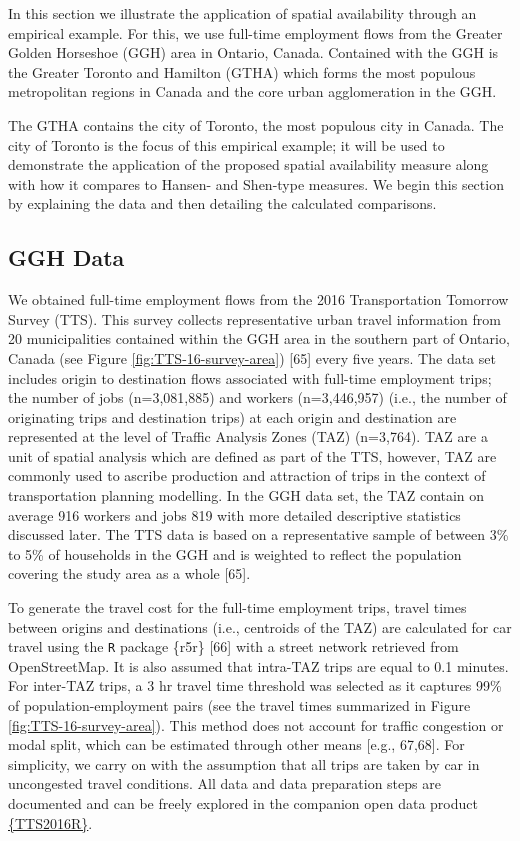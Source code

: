 \documentclass[10pt,letterpaper]{article}
\begin{document}
In this section we illustrate the application of spatial availability
through an empirical example. For this, we use full-time employment
flows from the Greater Golden Horseshoe (GGH) area in Ontario, Canada.
Contained with the GGH is the Greater Toronto and Hamilton (GTHA) which
forms the most populous metropolitan regions in Canada and the core
urban agglomeration in the GGH.

The GTHA contains the city of Toronto, the most populous city in Canada.
The city of Toronto is the focus of this empirical example; it will be
used to demonstrate the application of the proposed spatial availability
measure along with how it compares to Hansen- and Shen-type measures. We
begin this section by explaining the data and then detailing the
calculated comparisons.

\hypertarget{ggh-data}{%
\subsection{GGH Data}\label{ggh-data}}

We obtained full-time employment flows from the 2016 Transportation
Tomorrow Survey (TTS). This survey collects representative urban travel
information from 20 municipalities contained within the GGH area in the
southern part of Ontario, Canada (see Figure
\ref{fig:TTS-16-survey-area}) {[}65{]} every five years. The data set
includes origin to destination flows associated with full-time
employment trips; the number of jobs (n=3,081,885) and workers
(n=3,446,957) (i.e., the number of originating trips and destination
trips) at each origin and destination are represented at the level of
Traffic Analysis Zones (TAZ) (n=3,764). TAZ are a unit of spatial
analysis which are defined as part of the TTS, however, TAZ are commonly
used to ascribe production and attraction of trips in the context of
transportation planning modelling. In the GGH data set, the TAZ contain
on average 916 workers and jobs 819 with more detailed descriptive
statistics discussed later. The TTS data is based on a representative
sample of between 3\% to 5\% of households in the GGH and is weighted to
reflect the population covering the study area as a whole {[}65{]}.

To generate the travel cost for the full-time employment trips, travel
times between origins and destinations (i.e., centroids of the TAZ) are
calculated for car travel using the \texttt{R} package \{r5r\} {[}66{]}
with a street network retrieved from OpenStreetMap. It is also assumed
that intra-TAZ trips are equal to 0.1 minutes. For inter-TAZ trips, a 3
hr travel time threshold was selected as it captures 99\% of
population-employment pairs (see the travel times summarized in Figure
\ref{fig:TTS-16-survey-area}). This method does not account for traffic
congestion or modal split, which can be estimated through other means
{[}e.g., 67,68{]}. For simplicity, we carry on with the assumption that
all trips are taken by car in uncongested travel conditions. All data
and data preparation steps are documented and can be freely explored in
the companion open data product
\href{https://soukhova.github.io/TTS2016R/}{\{TTS2016R\}}.
\end{document}
